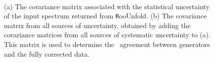 \begin{figure}
~
~
\caption{(a) The covariance matrix associated with the statistical uncertainty of the input spectrum returned from {\texttt RooUnfold}. (b) The covariance matrix from all sources of uncertainty, obtained by adding the covariance matrices from all sources of systematic uncertainty to (a). This matrix is used to determine the \chisq\ agreement between generators and the fully corrected data.}
\label{fig:cov}
\end{figure}



